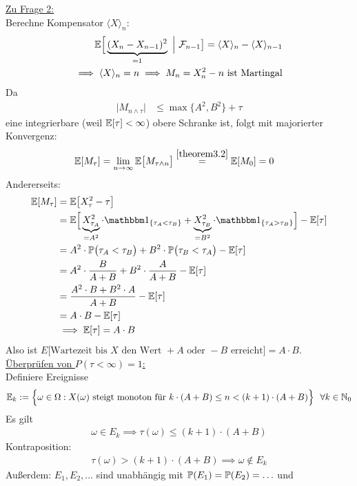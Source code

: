 \begin{beisp}
	\underline{Zu Frage 2:}\\
	Berechne Kompensator $\langle X\rangle_n$:
	\begin{align*}
		\E\Big[\underbrace{(X_n-X_{n-1})^2}_{=1}~\Big|~\F_{n-1}\big]=\langle X\rangle_n-\langle X\rangle_{n-1}\\
		\implies \langle X\rangle_n=n
		\implies M_n=X_n^2-n\text{ ist Martingal}
	\end{align*}
	Da
	\begin{align*}
		\big|M_{n\wedge\tau}\big|&\leq
		\max\lbrace A^2,B^2\rbrace+\tau
	\end{align*}
	eine integrierbare (weil $\E[\tau]<\infty$) obere Schranke ist, folgt mit majorierter Konvergenz:
	\begin{align*}
		\E[M_\tau]&=\limn\E\big[M_{\tau\wedge n}\big]\stackeq{\ref{theorem3.2}}
		\E[M_0]=0
	\end{align*}
	Andererseits:
	\begin{align*}
		\E[M_\tau]
		&=\E\big[X_\tau^2-\tau\big]\\
		&=\E\Big[\underbrace{X^2_{\tau_A}}_{=A^2}\cdot\indi_{\lbrace\tau_A<\tau_B\rbrace}+\underbrace{X^2_{\tau_B}}_{=B^2}\cdot\indi_{\lbrace\tau_A>\tau_B\rbrace}\Big] - \E[\tau]\\
		&=A^2\cdot\P\big(\tau_A<\tau_B\big)+B^2\cdot\P\big(\tau_B<\tau_A\big)-\E[\tau]\\
		&=A^2\cdot\frac{B}{A+B}+B^2\cdot\frac{A}{A+B}-\E[\tau]\\
		&=\frac{A^2\cdot B + B^2 \cdot A}{A+B}-\E[\tau]\\
		&=A\cdot B-\E[\tau]\\
		&\implies
		\E[\tau]=A\cdot B
	\end{align*}
	Also ist $E\big[\text{Wartezeit bis }X\text{ den Wert }+A\text{ oder }-B\text{ erreicht}\big]=A\cdot B$.\nl
	\underline{Überprüfen von $P(\tau<\infty)=1$:}\\
	Definiere Ereignisse
	\begin{align*}
		\E_k:=\Big\lbrace\omega\in\Omega:X(\omega)\text{ steigt monoton für }k\cdot(A+B)\leq n<(k+1)\cdot(A+B)\Big\rbrace~~\forall k\in\N_0
	\end{align*}
	Es gilt
	\begin{align*}
		\omega\in E_k\implies \tau(\omega)\leq(k+1)\cdot(A+B)
	\end{align*}
	Kontraposition:
	\begin{align*}
		\tau(\omega)>(k+1)\cdot(A+B)\implies\omega\not\in E_k
	\end{align*}
	Außerdem: $E_1,E_2,\ldots$ sind unabhängig mit $\P(E_1)=\P(E_2)=\ldots$ und

\end{beisp}
